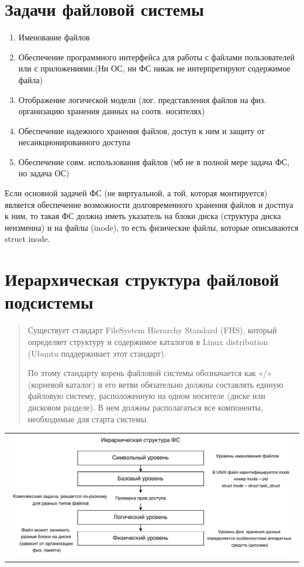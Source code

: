 \section{Задачи файловой системы}
\begin{enumerate}
    \item Именование файлов
    \item Обеспечение программного интерфейса для работы с файлами пользователей или с приложениями.(Ни ОС, ни ФС никак не интерпретируют содержимое файла)
    \item Отображение логической модели (лог. представления файлов на физ. организацию хранения данных на соотв. носителях)
    \item Обеспечение надежного хранения файлов, доступ к ним и защиту от несанкционированного доступа
    \item Обеспечение совм. использования файлов (мб не в полной мере задача ФС, но задача ОС)
\end{enumerate}

Если основной задачей ФС (не виртуальной, а той, которая монтируется) является обеспечение возможности долговременного хранения файлов и достпуа к ним, то такая ФС должна иметь указатель на блоки диска (структура диска неизменна) и на файлы (inode), то есть физические файлы, которые описываются struct inode.

\section{Иерархическая структура файловой подсистемы}

\begin{quote}
Существует стандарт FileSystem Hierarchy Standard (FHS), который определяет структуру и содержимое каталогов в Linux distribution (Ubuntu поддерживает этот стандарт).

По этому стандарту корень файловой системы обозначается как «/» (корневой каталог) и его ветви обязательно должны составлять единую файловую систему, расположенную на одном носителе (диске или дисковом разделе). В нем должны располагаться все компоненты, необходимые для старта системы.
\end{quote}

\begin{table}[h!]
  \centering
  \begin{tabular}{p{1\linewidth}}
    \centering
    \includegraphics[width=0.8\linewidth]{./images/ierarh_fs.pdf}
  \end{tabular}
\end{table}

